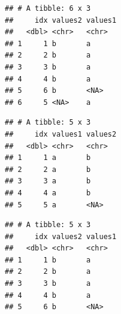 \documentclass[krantz2]{krantz}\usepackage{knitr}%
\begin{document}
\begin{knitrout}\footnotesize
{}\color{fgcolor}\begin{kframe}
\begin{alltt}
\end{alltt}


{\ttfamily\noindent\itshape{}}\begin{verbatim}
## # A tibble: 6 x 3
##     idx values2 values1
##   <dbl> <chr>   <chr>  
## 1     1 b       a      
## 2     2 b       a      
## 3     3 b       a      
## 4     4 b       a      
## 5     6 b       <NA>   
## 6     5 <NA>    a
\end{verbatim}
\end{kframe}
\end{knitrout}

\begin{knitrout}\footnotesize
{}\color{fgcolor}\begin{kframe}
\begin{alltt}
\end{alltt}


{\ttfamily\noindent\itshape{}}\begin{verbatim}
## # A tibble: 5 x 3
##     idx values1 values2
##   <dbl> <chr>   <chr>  
## 1     1 a       b      
## 2     2 a       b      
## 3     3 a       b      
## 4     4 a       b      
## 5     5 a       <NA>
\end{verbatim}
\end{kframe}
\end{knitrout}

\begin{knitrout}\footnotesize
{}\color{fgcolor}\begin{kframe}
\begin{alltt}
\end{alltt}


{\ttfamily\noindent\itshape{}}\begin{verbatim}
## # A tibble: 5 x 3
##     idx values2 values1
##   <dbl> <chr>   <chr>  
## 1     1 b       a      
## 2     2 b       a      
## 3     3 b       a      
## 4     4 b       a      
## 5     6 b       <NA>
\end{verbatim}
\end{kframe}
\end{knitrout}
\end{document}
